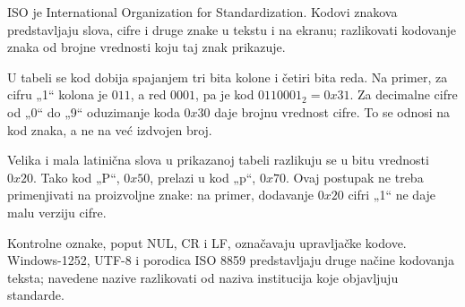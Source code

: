 ISO je International Organization for Standardization. Kodovi znakova predstavljaju slova, cifre i druge znake u tekstu i na ekranu; razlikovati kodovanje znaka od brojne vrednosti koju taj znak prikazuje.

U tabeli se kod dobija spajanjem tri bita kolone i četiri bita reda. Na primer, za cifru „1“ kolona je $011$, a red $0001$, pa je kod $0110001_2=0x31$. Za decimalne cifre od „0“ do „9“ oduzimanje koda $0x30$ daje brojnu vrednost cifre. To se odnosi na kod znaka, a ne na već izdvojen broj.

Velika i mala latinična slova u prikazanoj tabeli razlikuju se u bitu vrednosti $0x20$. Tako kod „P“, $0x50$, prelazi u kod „p“, $0x70$. Ovaj postupak ne treba primenjivati na proizvoljne znake: na primer, dodavanje $0x20$ cifri „1“ ne daje malu verziju cifre.

Kontrolne oznake, poput NUL, CR i LF, označavaju upravljačke kodove. Windows-1252, UTF-8 i porodica ISO 8859 predstavljaju druge načine kodovanja teksta; navedene nazive razlikovati od naziva institucija koje objavljuju standarde.
